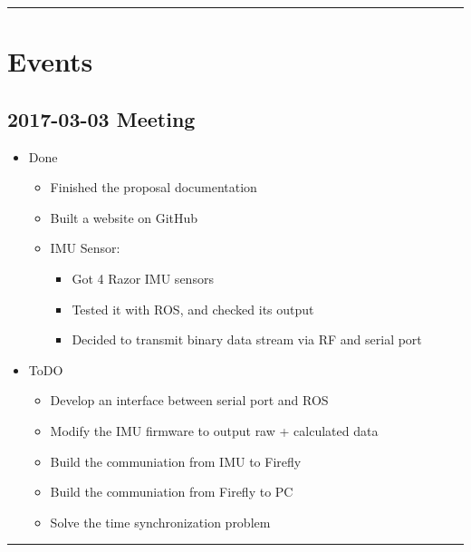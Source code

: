 \documentclass[letterpaper,12pt]{article}
\newcommand{\panhline}{\begin{center}\rule{\textwidth}{1pt}\end{center}}
\begin{document}
\panhline
\section{Events}

\subsection{2017-03-03 Meeting}

\begin{itemize}
	\item Done
	\begin{itemize}
		\item Finished the proposal documentation
		\item Built a website on GitHub
		\item IMU Sensor:
		\begin{itemize}
			\item Got 4 Razor IMU sensors
			\item Tested it with ROS, and checked its output
			\item Decided to transmit binary data stream via RF and serial port
		\end{itemize}
	\end{itemize}
	\item ToDO
	\begin{itemize}
		\item Develop an interface between serial port and ROS
		\item Modify the IMU firmware to output raw + calculated data
		\item Build the communiation from IMU to Firefly
		\item Build the communiation from Firefly to PC
		\item Solve the time synchronization problem		
	\end{itemize}
\end{itemize}

\panhline
\end{document}
